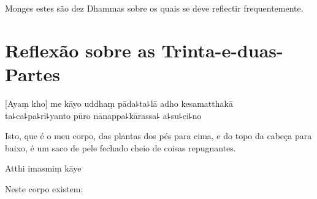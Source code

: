 \documentclass[
  babelLanguage=english,
  final,
  webversion,
]{chantingbook}
\begin{document}
\begin{english}
  Monges estes são dez Dhammas sobre os quais se deve reflectir frequentemente.
\end{english}

\cleartoverso

\chapter[Trinta-e-duas-Partes]{Reflexão sobre as Trinta-e-duas-Partes}


\begin{leader}
\end{leader}

[Ayaṃ kho] me kāyo uddhaṃ pāda꜕ta꜕lā adho kesamatthakā\\
ta꜕ca꜕pa꜕ri꜕yanto pūro nānappa꜕kārassa꜕ a꜕su꜕ci꜕no

\begin{english}
  Isto, que é o meu corpo, das plantas dos pés para cima, e do topo da cabeça para baixo, é um saco de pele fechado cheio de coisas repugnantes.
\end{english}

Atthi imasmiṃ kāye

\begin{english}
  Neste corpo existem:
\end{english}
\end{document}
